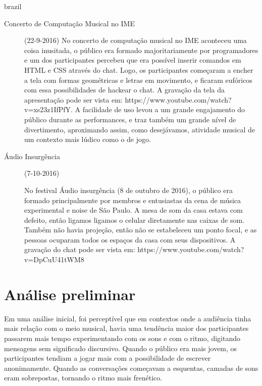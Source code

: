 \begin{otherlanguage*}{brazil}
\begin{description}
\item[Concerto de Computação Musical no IME] (22-9-2016)
No concerto de computação musical no IME aconteceu uma coisa inusitada, o público era formado majoritariamente por programadores e um dos participantes percebeu que era possível inserir comandos em HTML e CSS através do chat. Logo, os participantes começaram a encher a tela com formas geométricas e letras em movimento, e ficaram eufóricos com essa possibilidades de hackear o chat. A gravação da tela da apresentação pode ser vista em: https://www.youtube.com/watch?v=xs23z1IfPfY. A facilidade de uso levou a um grande engajamento do público durante as performances, e traz também um grande nível de divertimento, aproximando assim, como desejávamos, atividade musical de um contexto mais lúdico como o de jogo.

\item[Áudio Insurgência] (7-10-2016)

No festival Áudio insurgência (8 de outubro de 2016), o público era formado principalmente por membros e entusiastas da cena de música experimental e noise de São Paulo. A mesa de som da casa estava com defeito, então ligamos ligamos o celular diretamente nas caixas de som. Também não havia projeção, então não se estabeleceu um ponto focal, e as pessoas ocuparam todos os espaços da casa com seus dispositivos. A gravação do chat pode ser vista em: https://www.youtube.com/watch?v=DpCuU41tWM8 

\end{description}







\section{Análise preliminar}


Em uma análise inicial, foi perceptível que em contextos onde a audiência tinha mais relação com o meio musical, havia uma tendência maior dos participantes passarem mais tempo experimentando com os sons e com o ritmo, digitando mensagens sem significado discursivo. Quando o público era mais jovem, os participantes tendiam a jogar mais com a possibilidade de escrever anonimamente. Quando as conversações começavam a esquentas, camadas de sons eram sobrepostas, tornando o ritmo mais frenético.


\end{otherlanguage*}
